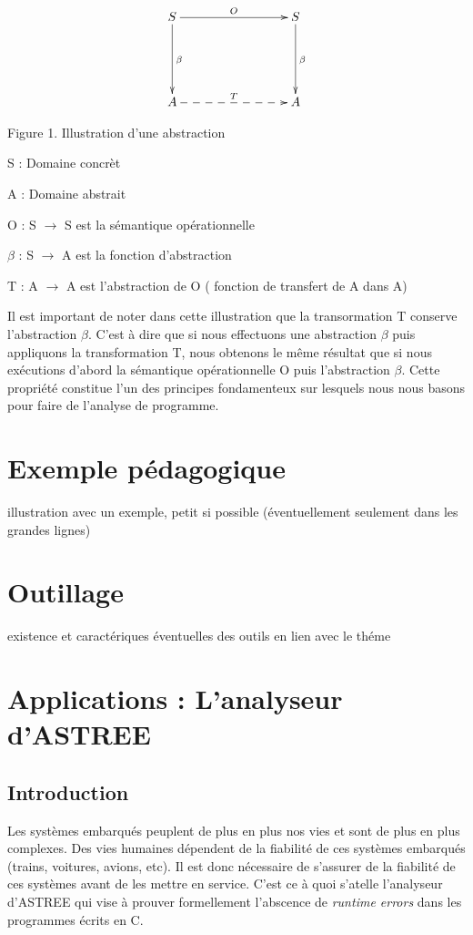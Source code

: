 \documentclass[french]{report}
\begin{document}
 \begin{equation*}
  \xymatrix@C+6em@R+3em{
   S \ar[r]^{O} \ar[d]^{\beta} & S \ar[d]^{\beta} \\
    A \ar@{-->}[r]^{T} & A
  }
 \end{equation*}
 
 \begin{center}Figure 1. Illustration d'une abstraction \end{center}
 
\begin{description}
    \item S : Domaine concrèt
    \item A : Domaine abstrait
    \item O : S $\rightarrow$ S est la sémantique opérationnelle
    \item $\beta$ : S $\rightarrow$ A est la fonction d'abstraction
    \item T : A $\rightarrow$ A est l'abstraction de O ( fonction de transfert de A dans A)
\end{description} 

Il est important de noter dans cette illustration que la transormation T conserve l'abstraction $\beta$. C'est à dire que si nous effectuons une abstraction $\beta$ puis appliquons la transformation T, nous obtenons le même résultat que si nous exécutions d'abord la sémantique opérationnelle O puis l'abstraction $\beta$. Cette propriété constitue l'un des principes fondamenteux sur lesquels nous nous basons pour faire de l'analyse de programme.

\section{Exemple pédagogique}

illustration avec un exemple, petit si possible  (éventuellement seulement dans les grandes lignes)

\section{Outillage}

existence et caractériques éventuelles des outils en lien avec le théme

\section{Applications : L'analyseur d'ASTREE}

\subsection{Introduction}
Les systèmes embarqués peuplent de plus en plus nos vies et sont de plus en plus complexes. Des vies humaines
dépendent de la fiabilité de ces systèmes embarqués (trains, voitures, avions, etc). Il est donc nécessaire de
s'assurer de la fiabilité de ces systèmes avant de les mettre en service.
C'est ce à quoi s'atelle l'analyseur d'ASTREE qui vise à prouver formellement
l'abscence de \textit{runtime errors} dans les programmes écrits en C. \\
\end{document}
